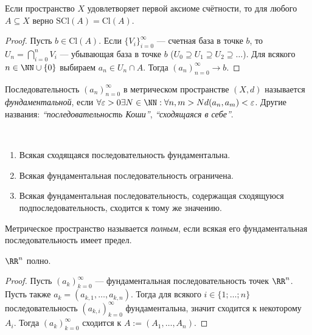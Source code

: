 \documentclass[12pt,a4paper]{article}
\newcommand{\Cl}{\ensuremath{\mathrm{Cl}}\xspace}
\newcommand{\SCl}{\ensuremath{\mathrm{SCl}}\xspace}
\begin{document}
    \begin{theorem}
        Если пространство $X$ удовлетворяет первой аксиоме счётности, то для любого $A \subseteq X$ верно $\SCl(A) = \Cl(A)$.
    \end{theorem}

    \begin{proof}
        Пусть $b \in \Cl(A)$. Если $\{V_i\}_{i = 0}^\infty$ --- счетная база в точке $b$, то $U_n = \bigcap_{i = 0}^n V_i$ --- убывающая база в точке $b$ ($U_0 \supseteq U_1 \supseteq U_2 \supseteq \dots$). Для всякого $n \in \NN \cup \{0\}$ выбираем $a_n \in U_n \cap A$. Тогда $(a_n)_{n=0}^\infty \to b$.
    \end{proof}

    \begin{definition}
        Последовательность $(a_n)_{n=0}^\infty$ в метрическом пространстве $(X, d)$ называется \emph{фундаментальной}, если $\forall \varepsilon > 0 \exists N \in \NN: \forall n, m > N d(a_n, a_m) < \varepsilon$. Другие названия: \emph{``последовательность Коши''}, \emph{``сходящаяся в себе''}.
    \end{definition}

    \begin{lemma}\ 
        \begin{enumerate}
            \item Всякая сходящаяся последовательность фундаментальна.
            \item Всякая фундаментальная последовательность ограничена.
            \item Всякая фундаментальная последовательность, содержащая сходящуюся подпоследовательность, сходится к тому же значению.
        \end{enumerate}
    \end{lemma}

    \begin{definition}
        Метрическое пространство называется \emph{полным}, если всякая его фундаментальная последовательность имеет предел.
    \end{definition}

    \begin{theorem}
        $\RR^n$ полно.
    \end{theorem}

    \begin{proof}
        Пусть $(a_k)_{k=0}^\infty$ --- фундаментальная последовательность точек $\RR^n$. Пусть также $a_k = (a_{k,1}, \dots, a_{k, n})$. Тогда для всякого $i \in \{1; \dots; n\}$ последовательность $(a_{k,i})_{k=0}^\infty$ фундаментальна, значит сходится к некоторому $A_i$. Тогда $(a_k)_{k=0}^\infty$ сходится к $A := (A_1, \dots, A_n)$.
    \end{proof}
\end{document}
